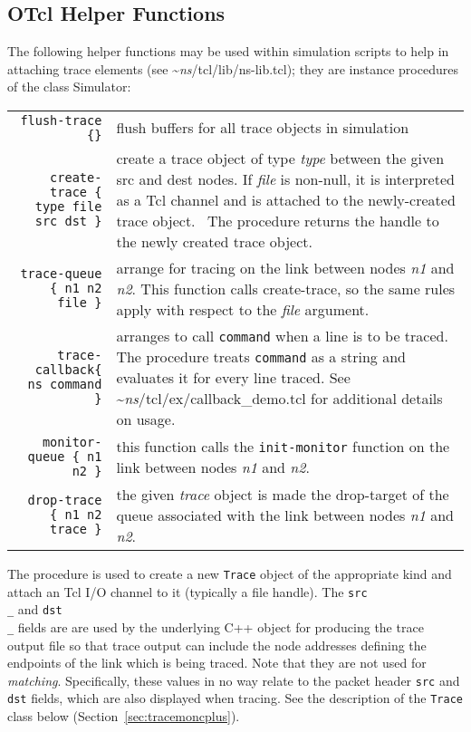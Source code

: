 \subsection{OTcl Helper Functions}
\label{sec:helptrace}

The following helper functions may be used within simulation
scripts to help in attaching trace elements (see \textasciitilde\emph{ns}/{tcl/lib/ns-lib.tcl});
they are instance procedures of the class Simulator:

\begin{tabularx}{\linewidth}{rX}
{\tt flush-trace \{\}} & flush buffers
        for all trace objects in simulation \\
{\tt create-trace \{ type file src dst \}} & create
        a trace object of type {\em type}
        between the given src and dest nodes.
        If {\em file} is non-null, it is interpreted as a Tcl channel
        and is attached to the newly-created trace object. \
        The procedure returns the handle to the newly created trace object.\\
{\tt trace-queue \{ n1 n2 file \}} & arrange for tracing on the link
        between nodes {\em n1} and {\em n2}.
        This function calls create-trace,
        so the same rules apply with respect to the {\em file} argument. \\
{\tt trace-callback\{ ns command \}} & arranges to call {\tt command}
        when a line is to be traced.
        The procedure treats {\tt command}
        as a string and evaluates it for every line traced.
        See \textasciitilde\emph{ns}/{tcl/ex/callback\_demo.tcl} for additional details on usage.\\
{\tt monitor-queue \{ n1 n2 \}} & this function
        calls the {\tt init-monitor} function
        on the link between nodes {\em n1} and {\em n2}. \\
{\tt drop-trace \{ n1 n2 trace \}} & the given {\em trace} object
        is made the drop-target of the queue
        associated with the link between nodes {\em n1} and {\em n2}.
\end{tabularx}

The  procedure is used to create a new {\tt Trace}
object of the appropriate kind and attach an Tcl I/O channel to it
(typically a file handle).
The {\tt src\\_} and {\tt dst\\_} fields are are used by the underlying C++
object for producing the trace output file so that trace output
can include the node addresses defining the endpoints of the link which
is being traced.
Note that they are not used for {\em matching}.  Specifically, these
values in no way relate to the packet header {\tt src} and {\tt dst}
fields, which are also displayed when tracing.
See the description of the {\tt Trace} class below (Section~\ref{sec:tracemoncplus}).

